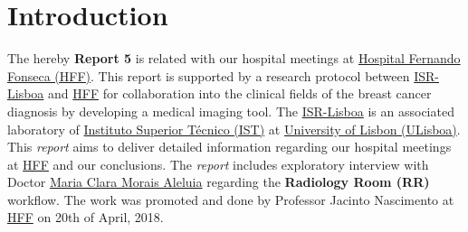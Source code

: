 
\section*{Introduction}

The hereby \textbf{Report 5} is related with our hospital meetings at \hyperlink{http://hff.min-saude.pt/}{Hospital Fernando Fonseca (HFF)}. This report is supported by a research protocol between \hyperlink{http://welcome.isr.tecnico.ulisboa.pt/}{ISR-Lisboa} and \hyperlink{http://hff.min-saude.pt/}{HFF} for collaboration into the clinical fields of the breast cancer diagnosis by developing a medical imaging tool. The \hyperlink{http://welcome.isr.tecnico.ulisboa.pt/}{ISR-Lisboa} is an associated laboratory of \hyperlink{http://tecnico.ulisboa.pt/}{Instituto Superior T\'{e}cnico (IST)} at \hyperlink{https://www.ulisboa.pt/}{University of Lisbon (ULisboa)}. This \textit{report} aims to deliver detailed information regarding our hospital meetings at \hyperlink{http://hff.min-saude.pt/}{HFF} and our conclusions. The \textit{report} includes exploratory interview with Doctor \hyperlink{https://www.researchgate.net/profile/Clara_Aleluia}{Maria Clara Morais Aleluia} regarding the \textbf{Radiology Room (RR)} workflow. The work was promoted and done by Professor Jacinto Nascimento at \hyperlink{http://hff.min-saude.pt/}{HFF} on 20th of April, 2018.